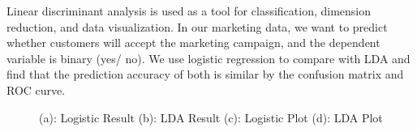 \documentclass[11pt]{article} %
\begin{document}
\quad Linear discriminant analysis is used as a tool for classification, dimension reduction, and data visualization. In our marketing data, we want to predict whether customers will accept the marketing campaign, and the dependent variable is binary (yes/ no). We use logistic regression to compare with LDA and find that the prediction accuracy of both is similar by the confusion matrix and ROC curve.
\begin{figure}[H]
    \centering
    \caption{(a): Logistic Result  (b): LDA Result (c): Logistic Plot (d): LDA Plot}
    \label{fig:foobar}
\end{figure}
\end{document}

